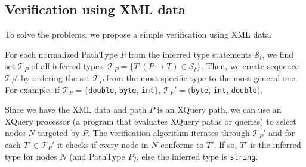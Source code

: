 \subsection{Verification using XML data}
To solve the problems, we propose a simple verification using XML data.

For each normalized PathType $P$ from the inferred type statements $\mathcal{S}_t$, we find set $\mathcal{T}_P$ of all inferred types. $\mathcal{T}_P = \{T|(P \rightarrow T) \in \mathcal{S}_t\}$. Then, we create sequence $\mathcal{T}_P'$ by ordering the set $\mathcal{T}_P$ from the most specific type to the most general one. For example, if $\mathcal{T}_P = \{$\texttt{double}, \texttt{byte}, \texttt{int}$\}$, $\mathcal{T}_P' = ($\texttt{byte}, \texttt{int}, \texttt{double}$)$.

Since we have the XML data and path $P$ is an XQuery path, we can use an XQuery processor (a program that evaluates XQuery paths or queries) to select nodes $N$ targeted by $P$. The verification algorithm iterates through $\mathcal{T}_P'$ and for each $T' \in \mathcal{T}_P'$ it checks if every node in $N$ conforms to $T'$. If so, $T'$ is the inferred type for nodes $N$ (and PathType $P$), else the inferred type is \texttt{string}.
